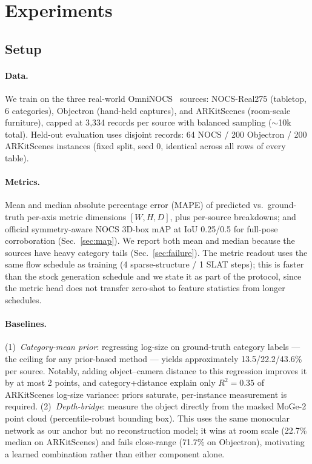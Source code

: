 \documentclass[runningheads]{llncs}
\begin{document}
\section{Experiments}
\label{sec:experiments}

\subsection{Setup}
\label{sec:setup}

\paragraph{Data.}
We train on the three real-world OmniNOCS~\cite{omninocs} sources: NOCS-Real275 (tabletop,
6 categories), Objectron (hand-held captures), and ARKitScenes (room-scale furniture),
capped at 3{,}334 records per source with balanced sampling ($\sim$10k total). Held-out
evaluation uses disjoint records: 64 NOCS / 200 Objectron / 200 ARKitScenes instances
(fixed split, seed 0, identical across all rows of every table).

\paragraph{Metrics.}
Mean and median absolute percentage error (MAPE) of predicted vs.\ ground-truth
per-axis metric dimensions $[W,H,D]$, plus per-source breakdowns; and official
symmetry-aware NOCS 3D-box mAP at IoU 0.25/0.5 for full-pose corroboration
(Sec.~\ref{sec:map}). We report both mean and median because the sources have heavy
category tails (Sec.~\ref{sec:failure}). The metric readout uses the same flow schedule
as training (4 sparse-structure / 1 SLAT steps); this is faster than the stock generation
schedule and we state it as part of the protocol, since the metric head does not
transfer zero-shot to feature statistics from longer schedules.

\paragraph{Baselines.}
(1)~\emph{Category-mean prior}: regressing log-size on ground-truth category labels ---
the ceiling for any prior-based method --- yields approximately 13.5/22.2/43.6\% per
source. Notably, adding object--camera distance to this regression improves it by at most
2 points, and category+distance explain only $R^2{=}0.35$ of ARKitScenes log-size
variance: priors saturate, per-instance measurement is required.
(2)~\emph{Depth-bridge}: measure the object directly from the masked MoGe-2 point cloud
(percentile-robust bounding box). This uses the same monocular network as our anchor but
no reconstruction model; it wins at room scale (22.7\% median on ARKitScenes) and fails
close-range (71.7\% on Objectron), motivating a learned combination rather than either
component alone.
\end{document}
